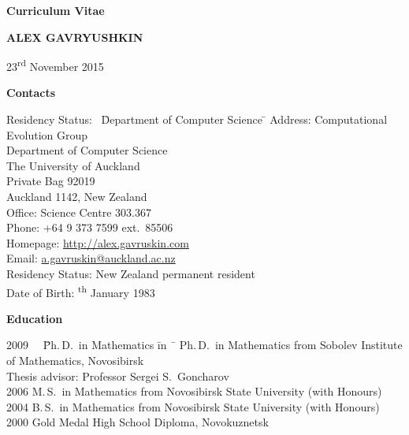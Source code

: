\documentclass[12pt]{article}
\begin{document}
\centerline{\large \bf Curriculum Vitae}
\vskip5mm
\centerline{\Large \bfseries A\normalsize LEX \Large G\normalsize AVRYUSHKIN}
\vskip5mm
\centerline{23\textsuperscript{rd} November 2015}
\vskip5mm

\centerline{\bf Contacts}
\begin{tabbing}
Residency Status:     \  \= Department of Computer Science \= \kill
Address:        \> Computational Evolution Group \\
		\> Department of Computer Science \\
		\> The University of Auckland\\
                \> Private Bag 92019\\
                \> Auckland 1142, New Zealand\\
Office:         \> Science Centre 303.367\\
Phone:          \> +64 9 373 7599 ext.\ 85506\\
Homepage:     \> \href{http://alex.gavruskin.com}{http://alex.gavruskin.com}   \\
Email:        \> \href{mailto:a.gavruskin@auckland.ac.nz}{a.gavruskin@auckland.ac.nz} \\
Residency Status:        \>New Zealand permanent resident\\
Date of Birth: \textsuperscript{th} January 1983\\
\end{tabbing}

\centerline{\bf Education}
\begin{tabbing}
2009 \ \ \= Ph.\,D.\ in Mathematics \= in \ \=        \> Ph.\,D.\ in Mathematics \>  from Sobolev Institute of Mathematics, Novosibirsk\\
                \>             \>  Thesis advisor: Professor Sergei S.\ Goncharov\\
2006       \> M.\,S.\ in Mathematics \>  from Novosibirsk State University (with Honours)\\
2004       \> B.\,S.\ in Mathematics \>  from Novosibirsk State University (with Honours)\\
2000       \> Gold Medal High School Diploma, Novokuznetsk%
\end{tabbing}
\end{document}
